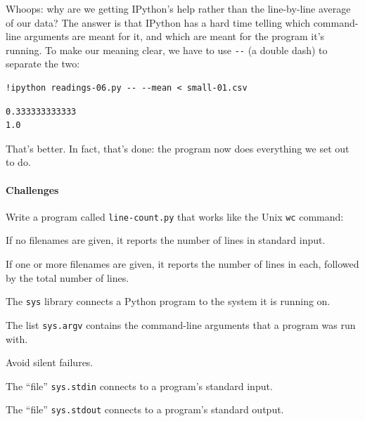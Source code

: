 \documentclass{book}
\begin{document}
Whoops: why are we getting IPython's help rather than the line-by-line
average of our data? The answer is that IPython has a hard time telling
which command-line arguments are meant for it, and which are meant for
the program it's running. To make our meaning clear, we have to use
\texttt{-{}-} (a double dash) to separate the two:

\begin{verbatim}
!ipython readings-06.py -- --mean < small-01.csv
\end{verbatim}

\begin{verbatim}
0.333333333333
1.0
\end{verbatim}

That's better. In fact, that's done: the program now does everything we
set out to do.

\mbox{}\paragraph{Challenges}

\begin{swcenumerate}
\item
  Write a program called \texttt{line-count.py} that works like the Unix
  \texttt{wc} command:

  \begin{swcitemize2}
  \item
    If no filenames are given, it reports the number of lines in
    standard input.
  \item
    If one or more filenames are given, it reports the number of lines
    in each, followed by the total number of lines.
   \end{swcitemize2}
\end{swcenumerate}

\begin{keypoints}
\begin{swcitemize}
\item
  The \texttt{sys} library connects a Python program to the system it is
  running on.
\item
  The list \texttt{sys.argv} contains the command-line arguments that a
  program was run with.
\item
  Avoid silent failures.
\item
  The ``file'' \texttt{sys.stdin} connects to a program's standard
  input.
\item
  The ``file'' \texttt{sys.stdout} connects to a program's standard
  output.
\end{swcitemize}
\end{keypoints}
\end{document}
